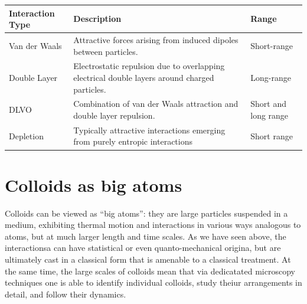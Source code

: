 \documentclass[
  letterpaper,
  enabledeprecatedfontcommands]{report}
\begin{document}
\begin{tcolorbox}[enhanced jigsaw, leftrule=.75mm, bottomrule=.15mm, toprule=.15mm, colbacktitle=quarto-callout-note-color!10!white, title=\textcolor{quarto-callout-note-color}{\faInfo}\hspace{0.5em}{Summary of main colloid-colloid interactions}, breakable, titlerule=0mm, opacitybacktitle=0.6, colback=white, coltitle=black, colframe=quarto-callout-note-color-frame, bottomtitle=1mm, rightrule=.15mm, toptitle=1mm, left=2mm, opacityback=0, arc=.35mm]

\begin{longtable}[]{@{}
  >{\raggedright\arraybackslash}p{}
  >{\raggedright\arraybackslash}p{}
  >{\raggedright\arraybackslash}p{}@{}}
\toprule\noalign{}
\begin{minipage}[b]{\linewidth}\raggedright
Interaction Type
\end{minipage} & \begin{minipage}[b]{\linewidth}\raggedright
Description
\end{minipage} & \begin{minipage}[b]{\linewidth}\raggedright
Range
\end{minipage} \\
\midrule\noalign{}
\endhead
\bottomrule\noalign{}
\endlastfoot
Van der Waals & Attractive forces arising from induced dipoles between
particles. & Short-range \\
Double Layer & Electrostatic repulsion due to overlapping electrical
double layers around charged particles. & Long-range \\
DLVO & Combination of van der Waals attraction and double layer
repulsion. & Short and long range \\
Depletion & Typically attractive interactions emerging from purely
entropic interactions & Short range \\
\end{longtable}

\end{tcolorbox}

\section{Colloids as big atoms}\label{colloids-as-big-atoms}

Colloids can be viewed as ``big atoms'': they are large particles
suspended in a medium, exhibiting thermal motion and interactions in
various ways analogous to atoms, but at much larger length and time
scales. As we have seen above, the interactionsa can have statistical or
even quanto-mechanical origina, but are ultimately cast in a classical
form that is amenable to a classical treatment. At the same time, the
large scales of colloids mean that via dedicatated microscopy techniques
one is able to identify individual colloids, study theiur arrangements
in detail, and follow their dynamics.
\end{document}
